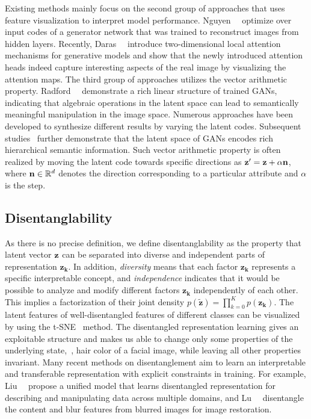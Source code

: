 Existing methods mainly focus on the second group of approaches that uses feature visualization to interpret model performance. 
Nguyen~\etal~\cite{nguyen2016synthesizing} optimize over input codes of a generator network that was trained to reconstruct images from hidden layers. 
Recently, Daras~\etal~\cite{daras2020your} introduce two-dimensional local attention mechanisms for generative models and show that the newly introduced attention heads indeed capture interesting aspects of the real image by visualizing the attention maps.
The third group of approaches utilizes the vector arithmetic property. 
Radford~\etal~\cite{radford2016dcgan} demonstrate a rich linear structure of trained GANs, indicating that algebraic operations in the latent space can lead to semantically meaningful manipulation in the image space. 
Numerous approaches have been developed to synthesize different results by varying the latent codes. 
Subsequent studies~\cite{bau2019inverting,shen2020interpreting,zhu2020indomain} further demonstrate that the latent space of GANs encodes rich hierarchical semantic information.
Such vector arithmetic property is often realized by moving the latent code towards specific directions as $\mathbf{z}^{\prime}=\mathbf{z}+\alpha \mathbf{n}$, where $\mathbf{n} \in \mathbb{R}^{d}$ denotes the direction corresponding to a particular attribute and $\alpha$ is the step.

\subsection{Disentanglability}
\label{sec:disentanglability}

As there is no precise definition, we define disentanglability as the property that latent vector $\mathbf{z}$ can be separated into diverse and independent parts of representation $\mathbf{z_k}$. 
In addition, \textit{diversity} means that each factor $\mathbf{z_k}$ represents a specific interpretable concept, and \textit{independence} indicates that it would be possible to analyze and modify different factors $\mathbf{z_k}$ independently of each other.
This implies a factorization of their joint density $p(\mathbf{\tilde{z}})=\prod_{k=0}^{K} p(\mathbf{{z}_{k}})$.
The latent features of well-disentangled features of different classes can be visualized~\cite{xia2020domain,li2020latent} by using the t-SNE~\cite{maaten2008visualizing} method. 
The disentangled representation learning gives an exploitable structure and makes us able to change only some properties of the underlying state,~\eg, hair color of a facial image, while leaving all other properties invariant. Many recent methods on disentanglement aim to learn an interpretable and transferable representation with explicit constraints in training. 
For example, Liu~\etal~\cite{liu2018unified} propose a unified model that learns disentangled representation for describing and manipulating data across multiple domains, and 
Lu~\etal~\cite{lu2019unsupervised} disentangle the content and blur features from blurred images for image restoration. 

